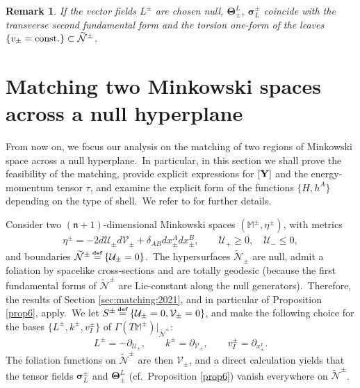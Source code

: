 \documentclass[11pt]{article}
\numberwithin{equation}{section}
\newtheorem{remark}[theorem]{Remark}
\def\Mkpm{\mathbb{M}^{\pm}}
\def\flatpm{\eta^{\pm}}
\def\defi{{\stackrel{\mbox{\tiny {\textbf{def}}}}{\,\, = \,\, }}}
\def\n{\mathfrak{n}}
\def\bY{\textup{\textbf{Y}}}
\newcommand\N{\mathcal N}
\def\defi{{\stackrel{\mbox{\tiny \textup{\textbf{def}}}}{\,\, = \,\, }}}
\def\n{\mathfrak{n}}
\def\bY{\textup{\textbf{Y}}}
\newcommand{\cp}{\partial}
\newcommand{\bs}{\boldsymbol}
\newcommand{\cu}{\mathcal{U}}
\newcommand{\cv}{\mathcal{V}}
\newcommand{\nullhyp}{\widetilde{\N}}
\begin{document}
\begin{remark}
If the vector fields $L^{\pm}$ are chosen null, $\bs{\Theta}_{\pm}^{L}$, $\bs{\sigma}^{\pm}_L$ coincide with the transverse second fundamental form and the torsion one-form of the leaves $\{v_{\pm}=\textup{const.}\}\subset\nullhyp^{\pm}$.\
\end{remark}


\section{Matching two Minkowski spaces across a null hyperplane}\label{sec:intro:MK}

From now on, we focus our analysis on the 
matching of two regions of Minkowski space across a null hyperplane.\ In particular, in this section we shall 
prove the feasibility of the matching, provide explicit expressions for $[\bY]$ and the 
energy-momentum tensor $\tau$, and examine the explicit form of the functions $\{H, h^A\}$ depending on the type of 
shell.\ We refer to   \cite{manzano2021null,manzano2023matching} for further details.




Consider two $(\n+1)$-dimensional Minkowski spaces $(\Mkpm,\flatpm)$, with metrics
\begin{align}
	\label{Mk:spacetimes}	\flatpm=-2d\cu_{\pm} d \cv_{\pm}+\delta_{AB} dx_{\pm}^A dx_{\pm}^{B},\qquad 
	\cu_+\geq0, \quad \cu_-\leq0, 
\end{align}
and boundaries 
$\nullhyp^{\pm} \defi \{ \cu_{\pm} =0\}$.\ 
The hypersurfaces $\nullhyp_{\pm}$ are null, admit a foliation by spacelike cross-sections and are totally geodesic (because the first fundamental forms of $\nullhyp^{\pm}$ are Lie-constant along the null generators).\  
Therefore, 
the results of Section \ref{sec:matching:2021}, and in particular of Proposition \ref{prop6}, apply.\ 
We let $S^{\pm}\defi \{\cu_{\pm}=0, \cv_{\pm}=0\}$, and make the following choice for the bases $\{L^{\pm},k^{\pm},v_I^{\pm}\}$ of $\Gamma(T\Mkpm)\vert_{\nullhyp^{\pm}}$:
\begin{equation}
	\label{basis:L,k,v:Mk} 
	L^{\pm}=-\cp_{\cu_{\pm}},\qquad k^{\pm}=\cp_{\cv_{\pm}},\qquad v^{\pm}_I=\cp_{x^I_{\pm}}.
\end{equation} 
The foliation functions on $\nullhyp^{\pm}$ are then $\cv_{\pm}$, and a direct calculation \cite{manzano2021null}  
yields that the tensor fields $\bs{\sigma}_{L}^{\pm}$ and $\bs{\Theta}^{L}_{\pm}$ (cf.\ Proposition \ref{prop6}) vanish everywhere on $\nullhyp^{\pm}$.\ 
\end{document}
